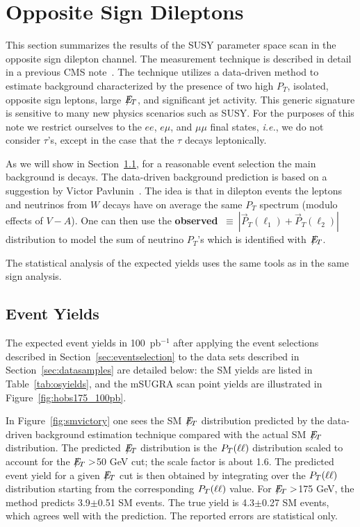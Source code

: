 \section{Opposite Sign Dileptons}
\label{sec:osstudies}

This section summarizes the results of the SUSY parameter space scan
in the opposite sign dilepton channel. The measurement technique is
described in detail in a previous CMS note~\cite{osnote}. The technique
utilizes a data-driven method to estimate background characterized
by the presence of two high $P_T$, isolated, opposite sign leptons,
large $E\!\!\!\!/_T$, and significant jet activity. This generic signature is
sensitive to many new physics scenarios such as SUSY.  For the purposes
of this note we restrict ourselves to the $ee$, $e\mu$, and $\mu\mu$
final states, {\em i.e.}, we do not consider $\tau$'s, except in the
case that the $\tau$ decays leptonically. 

As we will show in Section~\ref{sec:osyields}, for a reasonable event
selection the main background is \ttbar decays. The data-driven
background prediction is based on a suggestion by Victor
Pavlunin~\cite{victor}. The idea is that in dilepton \ttbar events
the leptons and neutrinos from $W$ decays have on average the same
$P_T$ spectrum (modulo effects of $V-A$). One can then use the {\bf
observed} \ptll $~\equiv~|\vec{P}_T(\ell_1) + \vec{P}_T(\ell_2)|$
distribution to model the sum of neutrino $P_T$'s which is identified
with $E\!\!\!\!/_T$. 

The statistical analysis of the expected yields uses the same tools as in the same sign analysis.

\subsection{Event Yields}
\label{sec:osyields}

The expected event yields in 100~pb$^{-1}$ after applying the event selections
described in Section~\ref{sec:eventselection} to the data sets described in
Section~\ref{sec:datasamples} are detailed below: the SM yields are listed in
Table~\ref{tab:osyields}, and the mSUGRA scan point yields are illustrated in
Figure~\ref{fig:hobs175_100pb}.

In Figure~\ref{fig:smvictory} one sees the SM $E\!\!\!\!/_T$ distribution predicted
by the data-driven background estimation technique compared with the actual 
SM $E\!\!\!\!/_T$ distribution. The predicted $E\!\!\!\!/_T$ distribution
is the $P_T(\ell\ell)$ distribution scaled to account for the $E\!\!\!\!/_T>$50 GeV cut; the scale
factor is about 1.6. The predicted event yield for a given $E\!\!\!\!/_T$ cut is then obtained by integrating
over the $P_T(\ell\ell)$ distribution starting from the corresponding $P_T(\ell\ell)$ value. 
For $E\!\!\!\!/_T>$175 GeV, the method predicts
3.9$\pm$0.51 SM events. The true yield is 4.3$\pm$0.27 SM events, which agrees
well with the prediction. The reported errors are statistical only.

